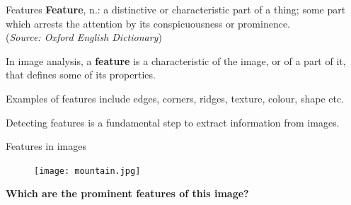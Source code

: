 \documentclass[9pt, aspectratio=169]{beamer}
\begin{document}
\begin{frame}
    {Features}
    \textbf{Feature}, n.: a distinctive or characteristic part of a thing; some part which arrests the attention by its conspicuousness or prominence.\\
    (\textit{Source: Oxford English Dictionary})
    \pause

    \vspace{2em}

    In image analysis, a \textbf{feature} is a characteristic of the image, or of a part of it, that defines some of its properties.

    Examples of features include edges, corners, ridges, texture, colour, shape etc.

    \pause
    \vspace{2em}
    Detecting features is a fundamental step to extract information from images.
\end{frame}

\begin{frame}
    {Features in images}
    \begin{figure}
        \texttt{[image: mountain.jpg]}
        \caption{\small{\color{gray}{View in the Gran Sasso mountain range, Italy - Photo: Nicola Roman\`o}\color{black}}}
    \end{figure}
    \centering
    \textbf{Which are the prominent features of this image?}
\end{frame}
\end{document}
